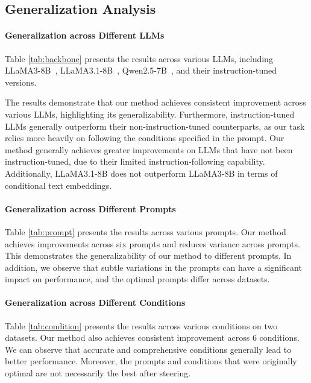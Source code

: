 \documentclass[11pt]{article}
\begin{document}
\subsection{Generalization Analysis}
\paragraph{Generalization across Different LLMs}
Table \ref{tab:backbone} presents the results across various LLMs, including LLaMA3-8B~\cite{dubey2024llama}, LLaMA3.1-8B~\cite{dubey2024llama}, Qwen2.5-7B~\cite{qwen2.5}, and their instruction-tuned versions.

The results demonstrate that our method achieves consistent improvement across various LLMs, highlighting its generalizability.
Furthermore, instruction-tuned LLMs generally outperform their non-instruction-tuned counterparts, as our task relies more heavily on following the conditions specified in the prompt.
Our method generally achieves greater improvements on LLMs that have not been instruction-tuned, due to their limited instruction-following capability.
Additionally, LLaMA3.1-8B does not outperform LLaMA3-8B in terms of conditional text embeddings.


\paragraph{Generalization across Different Prompts}
Table \ref{tab:prompt} presents the results across various prompts.
Our method achieves improvements across six prompts and reduces variance across prompts.
This demonstrates the generalizability of our method to different prompts.
In addition, we observe that subtle variations in the prompts can have a significant impact on performance, and the optimal prompts differ across datasets.

\paragraph{Generalization across Different Conditions}
Table \ref{tab:condition} presents the results across various conditions on two datasets.
Our method also achieves consistent improvement across 6 conditions.
We can observe that accurate and comprehensive conditions generally lead to better performance.
Moreover, the prompts and conditions that were originally optimal are not necessarily the best after steering.
\end{document}
